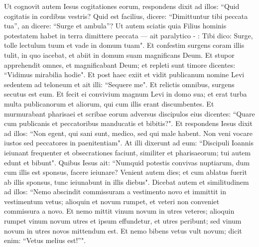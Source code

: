 \begin{biblechapter}
\verse Ut cognovit autem Iesus cogitationes eorum, respondens dixit ad illos: “Quid cogitatis in cordibus vestris? 
\verse Quid est facilius, dicere: “Dimittuntur tibi peccata tua”, an dicere: “Surge et ambula”? 
\verse Ut autem sciatis quia Filius hominis potestatem habet in terra dimittere peccata — ait paralytico - : Tibi dico: Surge, tolle lectulum tuum et vade in domum tuam". 
\verse Et confestim surgens coram illis tulit, in quo iacebat, et abiit in domum suam magnificans Deum. 
\verse Et stupor apprehendit omnes, et magnificabant Deum; et repleti sunt timore dicentes: “Vidimus mirabilia hodie". 
\verse Et post haec exiit et vidit publicanum nomine Levi sedentem ad teloneum et ait illi: “Sequere me". 
\verse Et relictis omnibus, surgens secutus est eum. 
\verse Et fecit ei convivium magnum Levi in domo sua; et erat turba multa publicanorum et aliorum, qui cum illis erant discumbentes. 
\verse Et murmurabant pharisaei et scribae eorum adversus discipulos eius dicentes: “Quare cum publicanis et peccatoribus manducatis et bibitis?". 
\verse Et respondens Iesus dixit ad illos: “Non egent, qui sani sunt, medico, sed qui male habent. 
\verse Non veni vocare iustos sed peccatores in paenitentiam". 
\verse At illi dixerunt ad eum: “Discipuli Ioannis ieiunant frequenter et obsecrationes faciunt, similiter et pharisaeorum; tui autem edunt et bibunt". 
\verse Quibus Iesus ait: “Numquid potestis convivas nuptiarum, dum cum illis est sponsus, facere ieiunare? 
\verse Venient autem dies; et cum ablatus fuerit ab illis sponsus, tunc ieiunabunt in illis diebus". 
\verse Dicebat autem et similitudinem ad illos: “Nemo abscindit commissuram a vestimento novo et immittit in vestimentum vetus; alioquin et novum rumpet, et veteri non conveniet commissura a novo. 
\verse Et nemo mittit vinum novum in utres veteres; alioquin rumpet vinum novum utres et ipsum effundetur, et utres peribunt; 
\verse sed vinum novum in utres novos mittendum est. 
\verse Et nemo bibens vetus vult novum; dicit enim: “Vetus melius est!”". 
\end{biblechapter}

